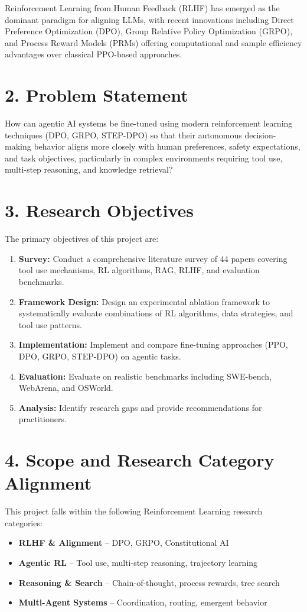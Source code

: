 \documentclass[12pt]{article}
\begin{document}
Reinforcement Learning from Human Feedback (RLHF) has emerged as the dominant paradigm for aligning LLMs, with recent innovations including Direct Preference Optimization (DPO), Group Relative Policy Optimization (GRPO), and Process Reward Models (PRMs) offering computational and sample efficiency advantages over classical PPO-based approaches.

\section*{2. Problem Statement}

How can agentic AI systems be fine-tuned using modern reinforcement learning techniques (DPO, GRPO, STEP-DPO) so that their autonomous decision-making behavior aligns more closely with human preferences, safety expectations, and task objectives, particularly in complex environments requiring tool use, multi-step reasoning, and knowledge retrieval?

\section*{3. Research Objectives}

The primary objectives of this project are:
\begin{enumerate}
    \item \textbf{Survey:} Conduct a comprehensive literature survey of 44 papers covering tool use mechanisms, RL algorithms, RAG, RLHF, and evaluation benchmarks.
    \item \textbf{Framework Design:} Design an experimental ablation framework to systematically evaluate combinations of RL algorithms, data strategies, and tool use patterns.
    \item \textbf{Implementation:} Implement and compare fine-tuning approaches (PPO, DPO, GRPO, STEP-DPO) on agentic tasks.
    \item \textbf{Evaluation:} Evaluate on realistic benchmarks including SWE-bench, WebArena, and OSWorld.
    \item \textbf{Analysis:} Identify research gaps and provide recommendations for practitioners.
\end{enumerate}

\section*{4. Scope and Research Category Alignment}

This project falls within the following Reinforcement Learning research categories:
\begin{itemize}
    \item \textbf{RLHF \& Alignment} -- DPO, GRPO, Constitutional AI
    \item \textbf{Agentic RL} -- Tool use, multi-step reasoning, trajectory learning
    \item \textbf{Reasoning \& Search} -- Chain-of-thought, process rewards, tree search
    \item \textbf{Multi-Agent Systems} -- Coordination, routing, emergent behavior
\end{itemize}
\end{document}
